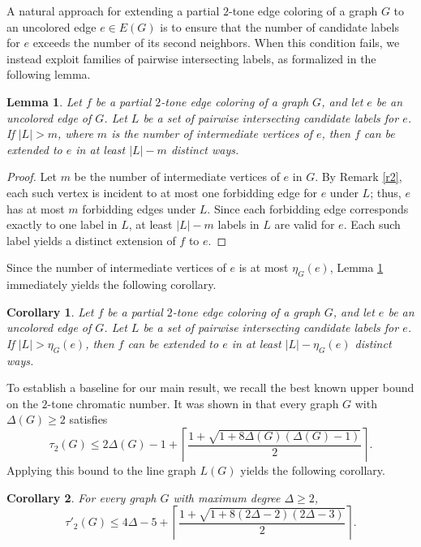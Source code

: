 \documentclass[12pt]{article}
\theoremstyle{plain}
\numberwithin{theorem}{section}
\numberwithin{conjecture}{section}
\newtheorem{corollary}{Corollary}
\numberwithin{corollary}{section}
\numberwithin{example}{section}
\newtheorem{lemma}{Lemma}
\numberwithin{lemma}{section}
\numberwithin{proposition}{section}
\numberwithin{problem}{section}
\numberwithin{remark}{section}
\numberwithin{claim}{theorem}
\numberwithin{definition}{section}
\begin{document}
A natural approach for extending a partial $2$-tone edge coloring of a graph $G$ to an uncolored edge $e\in E(G)$ is to ensure that the number of candidate labels for $e$ exceeds the number of its second neighbors. When this condition fails, we instead exploit families of pairwise intersecting labels, as formalized in the following lemma.

\begin{lemma}\label{l1}
Let $f$ be a partial $2$-tone edge coloring of a graph $G$, and let $e$ be an uncolored edge of $G$. Let $L$ be a set of pairwise intersecting candidate labels for $e$. If $|L| > m$, where $m$ is the number of intermediate vertices of $e$, then $f$ can be extended to $e$ in at least $|L| - m$ distinct ways.
\end{lemma}

\begin{proof}
Let $m$ be the number of intermediate vertices of $e$ in $G$. By Remark \ref{r2}, each such vertex is incident to at most one forbidding edge for $e$ under $L$; thus, $e$ has at most $m$ forbidding edges under $L$. Since each forbidding edge corresponds exactly to one label in $L$, at least $|L| - m$ labels in $L$ are valid for $e$. Each such label yields a distinct extension of $f$ to $e$.\end{proof}

Since the number of intermediate vertices of $e$ is at most $\eta_G(e)$, Lemma \ref{l1} immediately yields the following corollary.

\begin{corollary}\label{x}
Let $f$ be a partial $2$-tone edge coloring of a graph $G$, and let $e$ be an uncolored edge of $G$. Let $L$ be a set of pairwise intersecting candidate labels for $e$. If $|L| > \eta_G(e)$, then $f$ can be extended to $e$ in at least $|L| - \eta_G(e)$ distinct ways.
\end{corollary}

To establish a baseline for our main result, we recall the best known upper bound on the $2$-tone chromatic number. It was shown in \cite{B1} that every graph $G$ with \(\Delta(G)\ge2\) satisfies
\[
\tau_2(G)\le 2\Delta(G)-1+\left\lceil \frac{1+\sqrt{1+8\Delta(G)(\Delta(G)-1)}}{2}\right\rceil .
\]
Applying this bound to the line graph $L(G)$ yields the following corollary.

\begin{corollary}\label{cc2}
For every graph $G$ with maximum degree $\Delta \ge 2$,
\[
\tau'_2(G) \le 4\Delta - 5 + \left\lceil \frac{1 + \sqrt{1 + 8(2\Delta - 2)(2\Delta - 3)}}{2} \right\rceil.
\]
\end{corollary}
\end{document}
